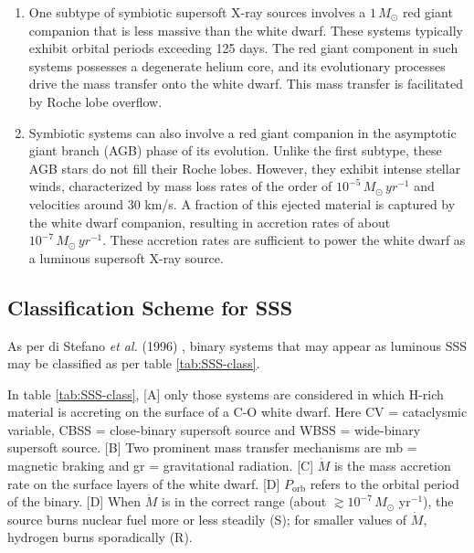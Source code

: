 				\begin{enumerate}
					\item One subtype of symbiotic supersoft X-ray sources involves a $1\,M_{\odot}$ red giant companion that is less massive than the white dwarf. These systems typically exhibit orbital periods exceeding 125 days. The red giant component in such systems possesses a degenerate helium core, and its evolutionary processes drive the mass transfer onto the white dwarf. This mass transfer is facilitated by Roche lobe overflow.
					\item Symbiotic systems can also involve a red giant companion in the asymptotic giant branch (AGB) phase of its evolution. Unlike the first subtype, these AGB stars do not fill their Roche lobes. However, they exhibit intense stellar winds, characterized by mass loss rates of the order of $10^{-5}\,M_{\odot}\,yr^{-1}$ and velocities around 30 km/s. A fraction of this ejected material is captured by the white dwarf companion, resulting in accretion rates of about $10^{-7}\,M_{\odot}\,yr^{-1}$. These accretion rates are sufficient to power the white dwarf as a luminous supersoft X-ray source.
				\end{enumerate}
		
		\subsection{Classification Scheme for SSS} \label{introduction:current_status:sss-classification}
			As per di Stefano \emph{et al.} (1996) \cite{distefano96}, binary systems that may appear as luminous SSS may be classified as per table \ref{tab:SSS-class}.
			
			In table \ref{tab:SSS-class}, [A] only those systems are considered in which H-rich material is accreting on the surface of a C-O white dwarf. Here CV = cataclysmic variable, CBSS = close-binary supersoft source and WBSS = wide-binary supersoft source. [B] Two prominent mass transfer mechanisms are mb = magnetic braking and gr = gravitational radiation. [C] $\dot{M}$ is the mass accretion rate on the surface layers of the white dwarf. [D] $P_\text{orb}$ refers to the orbital period of the binary. [D] When $\dot{M}$ is in the correct range (about $\gtrsim 10^{-7}\,M_{\odot}$ yr$^{-1}$), the source burns nuclear fuel more or less steadily (S); for smaller values of $\dot{M}$, hydrogen burns sporadically (R).
			
